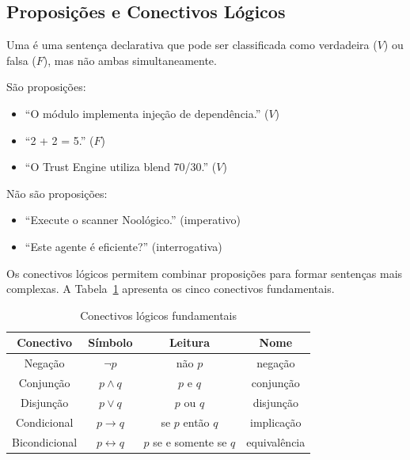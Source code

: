 \subsection{Proposições e Conectivos Lógicos}

\begin{definicao}[Proposição]
    Uma  é uma sentença declarativa que pode ser
    classificada como verdadeira ($V$) ou falsa ($F$), mas não ambas
    simultaneamente.
\end{definicao}

\begin{exemplo}
    São proposições:
    \begin{itemize}
        \item ``O módulo  implementa injeção de
              dependência.'' ($V$)
        \item ``2 + 2 = 5.'' ($F$)
        \item ``O Trust Engine utiliza blend 70/30.'' ($V$)
    \end{itemize}
    Não são proposições:
    \begin{itemize}
        \item ``Execute o scanner Noológico.'' (imperativo)
        \item ``Este agente é eficiente?'' (interrogativa)
    \end{itemize}
\end{exemplo}

Os conectivos lógicos permitem combinar proposições para formar sentenças
mais complexas. A Tabela~\ref{tab:conectivos} apresenta os cinco conectivos
fundamentais.

\begin{table}[htb]
    \centering
    \caption{Conectivos lógicos fundamentais}
    \label{tab:conectivos}
    \begin{tabular}{cccc}
        \toprule
        \textbf{Conectivo} & \textbf{Símbolo} & \textbf{Leitura} &
        \textbf{Nome} \\
        \midrule
        Negação & $\neg p$ & não $p$ & negação \\
        Conjunção & $p \land q$ & $p$ e $q$ & conjunção \\
        Disjunção & $p \lor q$ & $p$ ou $q$ & disjunção \\
        Condicional & $p \to q$ & se $p$ então $q$ & implicação \\
        Bicondicional & $p \leftrightarrow q$ & $p$ se e somente se $q$ &
        equivalência \\
        \bottomrule
    \end{tabular}
\end{table}

